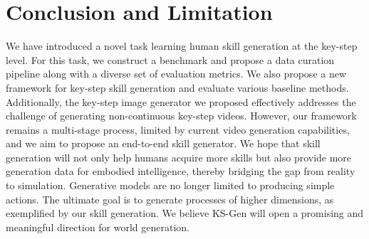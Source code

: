 \section{Conclusion and Limitation}


We have introduced a novel task learning human skill generation at the key-step level. For this task, we construct a benchmark and propose a data curation pipeline along with a diverse set of evaluation metrics. We also propose a new framework for key-step skill generation and evaluate various baseline methods. Additionally, the key-step image generator we proposed effectively addresses the challenge of generating non-continuous key-step videos.  However, our framework remains a multi-stage process, limited by current video generation capabilities, and we aim to propose an end-to-end skill generator. We hope that skill generation will not only help humans acquire more skills but also provide more generation data for embodied intelligence, thereby bridging the gap from reality to simulation. Generative models are no longer limited to producing simple actions. The ultimate goal is to generate processes of higher dimensions, as exemplified by our skill generation. We believe KS-Gen will open a promising and meaningful direction for world generation.